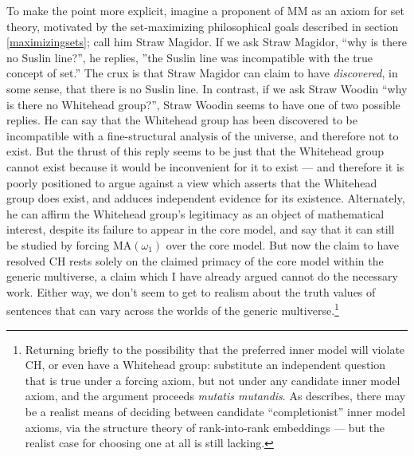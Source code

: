 \documentclass[letterpaper,12pt]{article}
\begin{document}



To make the point more explicit, imagine a proponent of MM as an axiom for set theory, motivated by the set-maximizing philosophical goals described in section \ref{maximizingsets}; call him Straw Magidor. If we ask Straw Magidor, ``why is there no Suslin line?'', he replies, ''the Suslin line was incompatible with the true concept of set.'' The crux is that Straw Magidor can claim to have \emph{discovered}, in some sense, that there is no Suslin line. In contrast, if we ask Straw Woodin ``why is there no Whitehead group?'', Straw Woodin seems to have one of two possible replies. He can say that the Whitehead group has been discovered to be incompatible with a fine-structural analysis of the universe, and therefore not to exist. But the thrust of this reply seems to be just that the Whitehead group cannot exist because it would be inconvenient for it to exist --- and therefore it is poorly positioned to argue against a view which asserts that the Whitehead group does exist, and adduces independent evidence for its existence. Alternately, he can affirm the Whitehead group's legitimacy as an object of mathematical interest, despite its failure to appear in the core model, and say that it can still be studied by forcing $\mathrm{MA}(\omega_1)$ over the core model. But now the claim to have resolved CH rests solely on the claimed primacy of the core model within the generic multiverse, a claim which I have already argued cannot do the necessary work. Either way, we don't seem to get to realism about the truth values of sentences that can vary across the worlds of the generic multiverse.\footnote{Returning briefly to the possibility that the preferred inner model will violate CH, or even have a Whitehead group: substitute an independent question that is true under a forcing axiom, but not under any candidate inner model axiom, and the argument proceeds \emph{mutatis mutandis}. As \cite{sep-continuum-hypothesis} describes, there may be a realist means of deciding between candidate ``completionist'' inner model axioms, via the structure theory of rank-into-rank embeddings --- but the realist case for choosing one at all is still lacking.}
\end{document}
